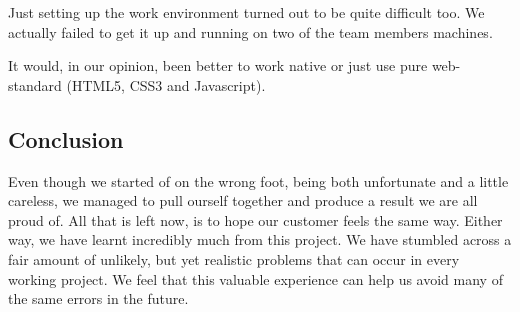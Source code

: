 Just setting up the work environment turned out to be quite difficult too. We actually failed to get it up and running on two of the team members machines.

It would, in our opinion, been better to work native or just use pure web-standard (HTML5, CSS3 and Javascript).

 
\subsection{Conclusion}

Even though we started of on the wrong foot, being both unfortunate and a little careless, we managed to pull ourself together and produce a result we are all proud of. All that is left now, is to hope our customer feels the same way. Either way, we have learnt incredibly much from this project. We have stumbled across a fair amount of unlikely, but yet realistic problems that can occur in every working project. We feel that this valuable experience can help us avoid many of the same errors in the future.